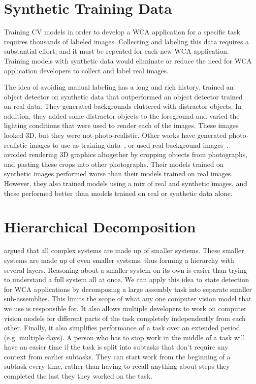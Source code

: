 \section{Synthetic Training Data}

Training CV models in order to develop a WCA application for a specific task
requires thousands of labeled images.
Collecting and labeling this data requires a substantial effort, and it must be
repeated for each new WCA application.
Training models with synthetic data would eliminate or reduce the need for
WCA application developers to collect and label real images.

The idea of avoiding manual labeling has a long and rich history.
\citet{synthetic} trained an object detector on synthetic data that
outperformed an object detector trained on real data. They generated backgrounds
cluttered with distractor objects. In addition, they added some distractor
objects to the foreground and varied the lighting conditions that were used to
render each of the images. These images looked 3D, but they were not
photo-realistic. Other works have generated photo-realistic images to use as
training data~\cite{DBLP:journals/corr/abs-1809-10790, photo2}, or used real
background images~\cite{real_background1, real_background2, real_background3}.
\citet{dwibedi} avoided rendering 3D graphics altogether by cropping objects
from photographs, and pasting these crops into other photographs.
Their models trained on synthetic images performed worse than their models
trained on real images.
However, they also  trained models using a mix of real and synthetic images, and
these performed better than models trained on real or synthetic data alone.

\section{Hierarchical Decomposition}

\citet{Simon1991} argued that all complex systems are made up of smaller
systems. These smaller systems are made up of even smaller systems, thus
forming a hierarchy with several layers.
Reasoning about a smaller system on its own is easier than trying to understand
a full system all at once.
We can apply this idea to state detection for WCA applications by decomposing
a large assembly task into separate smaller sub-assemblies.
This limits the scope of what any one computer vision model that we use is
responsible for.
It also allows multiple developers to work on computer vision models for
different parts of the task completely independently from each other.
Finally, it also simplifies performance of a task over an extended period
(e.g. multiple days). A person who has to stop work in the middle of a task will
have an easier time if the task is split into subtasks that don't require any
context from earlier subtasks. They can start work from the beginning of a
subtask every time, rather than having to recall anything about steps they
completed the last they they worked on the task.

